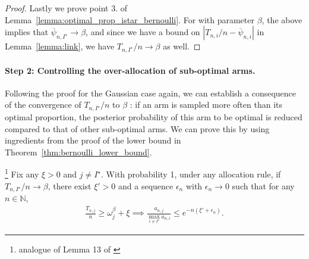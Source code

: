 \begin{proof}
Lastly we prove point $3.$ of Lemma~\ref{lemma:optimal_prop_istar_bernoulli}. For \TTTS with parameter $\beta$, the above implies that $\overline{\psi}_{n, I^\star} \rightarrow \beta$, and since we have a bound on $| T_{n,i} / n - \overline{\psi}_{n, i} |$ in Lemma~\ref{lemma:link}, we have $T_{n, I^\star} / n \rightarrow \beta$ as well.

\end{proof}

\paragraph{Step 2: Controlling the over-allocation of sub-optimal arms.}
Following the proof for the Gaussian case again, we can establish a consequence of the convergence of $T_{n,I^\star} / n$ to $\beta$ : if an arm is sampled more often than its optimal proportion, the posterior probability of this arm to be optimal is reduced compared to that of other sub-optimal arms. We can prove this by using ingredients from the proof of the lower bound in Theorem~\ref{thm:bernoulli_lower_bound}.

\begin{lemma}\label{lemma:over_allocation_bernoulli}
\begin{leftbar}\footnote{analogue of Lemma 13 of \cite{russo2016ttts}}
	Fix any $\xi > 0$ and $j \neq I^\star$. With probability 1, under any allocation rule, if $T_{n,I^\star}/n \rightarrow \beta$, there exist $\xi' > 0$ and a sequence $\epsilon_n$ with $\epsilon_n \rightarrow 0$ such that for any $n \in \mathbb{N}$, 
	\begin{align*}
	\frac{T_{n,j}}{n} \geq \omega_j^\beta + \xi \implies \frac{a_{n,j}}{\max_{i \neq I^\star} a_{n,i}} \leq e^{-n (\xi' + \epsilon_n)}.
	\end{align*}
\end{leftbar}
\end{lemma}

